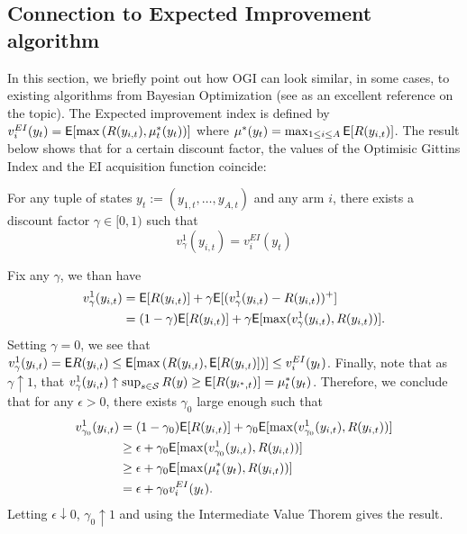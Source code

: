 \subsection{Connection to Expected Improvement algorithm}
In this section, we briefly point out how OGI can look similar, in some cases, to existing algorithms from Bayesian Optimization (see \cite{shahriari2016taking} as an excellent reference on the topic). The Expected improvement index is defined by $v^{EI}_i(y_{t}) = \mathsf{E}[\max\left(R(y_{i,t}), \mu^*_t(y_t)\right)]$ where $\mu^*(y_t) = \max_{1 \le i \le A} \mathsf{E}[R(y_{i,t})]$. The result below shows that for a certain discount factor, the values of the Optimisic Gittins Index and the EI acquisition function coincide:
\begin{proposition}
For any tuple of states $y_t := (y_{1,t}, \ldots, y_{A,t})$ and any arm $i$, there exists a discount factor $\gamma \in [0,1)$ such that
\[
v^{1}_{\gamma}(y_{i,t}) = v^{EI}_i(y_{t})
\]
\end{proposition}
\begin{myproof}[Proof.]
Fix any $\gamma$, we than have
\begin{align*}
v^1_{\gamma}(y_{i,t}) & = \mathsf{E}[R(y_{i,t})] + \gamma \mathsf{E}[(v^1_{\gamma}(y_{i,t}) - R(y_{i,t}))^+] \\
& = (1-\gamma) \mathsf{E}[R(y_{i,t})] + \gamma\mathsf{E}[\max(v^1_{\gamma}(y_{i,t}), R(y_{i,t}))].
\end{align*}
Setting $\gamma = 0$, we see that $v^1_{\gamma}(y_{i,t}) = \mathsf{E}{R(y_{i,t})} \le \mathsf{E}[\max\left(R(y_{i,t}), \mathsf{E}[R(y_{i,t})]\right)] \le v^{EI}_i(y_t)$. Finally, note that as $\gamma \uparrow 1$, that $v^1_{\gamma}(y_{i,t}) \uparrow \sup_{s \in \mathcal{S}} R(y) \ge \mathsf{E}[R(y_{i^*,t})] = \mu^*_t(y_t)$. Therefore, we conclude that for any $\epsilon > 0$, there exists $\gamma_0$ large enough such that
\begin{align*}
v^{1}_{\gamma_0}(y_{i,t}) & = (1-\gamma_0) \mathsf{E}[R(y_{i,t})] + \gamma_0\mathsf{E}[\max(v^1_{\gamma_0}(y_{i,t}), R(y_{i,t}))]  \\
 & \ge \epsilon +  \gamma_0\mathsf{E}[\max(v^1_{\gamma_0}(y_{i,t}), R(y_{i,t}))] \\
 & \ge  \epsilon +  \gamma_0\mathsf{E}[\max( \mu^*_t(y_t), R(y_{i,t}))] \\
 & =  \epsilon +  \gamma_0v^{EI}_i(y_t).
\end{align*}
Letting $\epsilon \downarrow 0$, $\gamma_0 \uparrow 1$ and using the Intermediate Value Thorem gives the result.
\end{myproof}